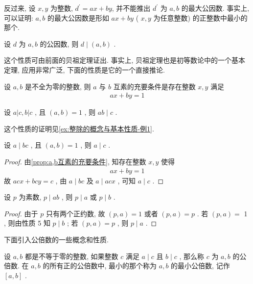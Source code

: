\begin{note}
	反过来, 设 $x ,  y$ 为整数, $d^{\prime}=a x+b y$, 并不能推出 $d^{\prime}$ 为 $a ,  b$ 的最大公因数. 事实上, 可以证明: $a ,  b$ 的最大公因数是形如 $a x+b y$ ( $x, y$ 为任意整数) 的正整数中最小的那个.
\end{note}

\begin{property}\label{prop:如果d是a,b公因数则d|(a,b)}
	设 $d$ 为 $a ,  b$ 的公因数, 则 $d \mid(a, b)$ . 
\end{property}

这个性质可由前面的贝祖定理证出. 事实上, 贝祖定理也是初等数论中的一个基本定理, 应用非常广泛, 下面的性质是它的一个直接推论.

\begin{property}\label{prop:a,b互素的充要条件}
设 $a ,  b$ 是不全为零的整数, 则 $a$ 与 $b$ 互素的充要条件是存在整数 $x ,  y$ 满足
\begin{align*}
	a x+b y=1
\end{align*}
\end{property}

\begin{property}
设 $a|c, b| c$ , 且 $(a, b)=1$ , 则 $a b \mid c$ . 
\end{property}
这个性质的证明见\autoref{ex:整除的概念与基本性质-例1}.

\begin{property}
	设 $a \mid b c$ , 且 $(a, b)=1$ , 则 $a \mid c$ . 
\end{property}
\begin{proof}
由\autoref{prop:a,b互素的充要条件}, 知存在整数 $x, y$ 使得
\begin{align*}
	a x+b y=1
\end{align*}
故 $a c x+b c y=c$ , 由 $a \mid b c$ 及 $a \mid a c x$ , 可知 $a \mid c$ . 
\end{proof}

\begin{property}\label{prop:如果p是ab的公因数则p是a或b的公因数}
	设 $p$ 为素数,  $p \mid a b$ , 则 $p \mid a$ 或 $p \mid b$ . 
\end{property}
\begin{proof}
	由于 $p$ 只有两个正约数, 故 $(p, a)=1$ 或者 $(p, a)=p$ . 若 $(p, a)=$ 1 , 则由性质 5 知 $p \mid b$ ; 若 $(p, a)=p$ , 则 $p \mid a$ .
\end{proof}

下面引入公倍数的一些概念和性质. 

设 $a ,  b$ 都是不等于零的整数, 如果整数 $c$ 满足 $a \mid c$ 且 $b \mid c$ , 那么称 $c$ 为 $a ,  b$ 的公倍数. 在 $a ,  b$ 的所有正的公倍数中, 最小的那个称为 $a ,  b$ 的最小公倍数, 记作 $[a, b]$ .

